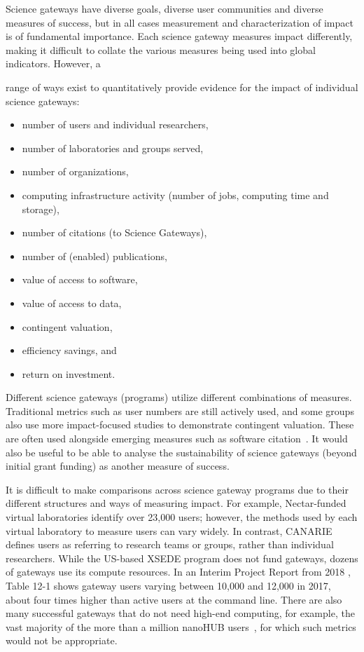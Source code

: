 \documentclass[review]{elsarticle}
\newcommand{\changedtext}[1]{
	{#1}
}
\begin{document}
\changedtext{Science gateways have diverse goals, diverse user communities and diverse measures of success, but 
in all cases measurement and characterization of impact is of fundamental importance.
Each science gateway measures impact differently, making it difficult to collate the various measures being used into global indicators. However, a} 
 range of ways exist to quantitatively provide evidence for the impact of individual science gateways:
\begin{itemize}
	\item number of users and individual researchers,
	\item number of laboratories and groups served,
	\item number of organizations,
	\item computing infrastructure activity (number of jobs, computing time and storage),
	\item number of  citations (to Science Gateways),
	\item number of  (enabled) publications,
	\item value of access to software,
	\item value of access to data,
	\item contingent valuation,
	\item efficiency savings, and
	\item return on investment.
\end{itemize}

\changedtext{Different science gateways (programs) utilize different combinations of measures.} Traditional metrics such as user numbers are still actively used, and some groups also use more impact-focused studies to demonstrate contingent valuation. These are often used alongside emerging measures such as software citation~\cite{force11-32}. 
It would also be useful to be able to analyse the sustainability of science gateways (beyond initial grant funding) as another measure of success.


It is difficult to make comparisons across science gateway programs due to their different structures and ways of measuring impact. For example, Nectar-funded virtual laboratories identify over 23,000 users; however, the methods used by each virtual laboratory to measure users can vary widely. In contrast, CANARIE defines users as referring to research teams or groups, rather than individual researchers. 
While the US-based XSEDE program does not fund gateways, dozens of gateways use its compute resources. 
In an Interim Project Report from 2018 \cite{xsede-85}, Table 12-1 shows gateway users varying between 10,000 and 12,000 in 2017, about four times higher than active users at the command line.  There are also many successful gateways that do not need high-end computing, for example, the vast majority of the more than a million nanoHUB users~\cite{nanohub-33}, for which such metrics would not be appropriate.
\end{document}
